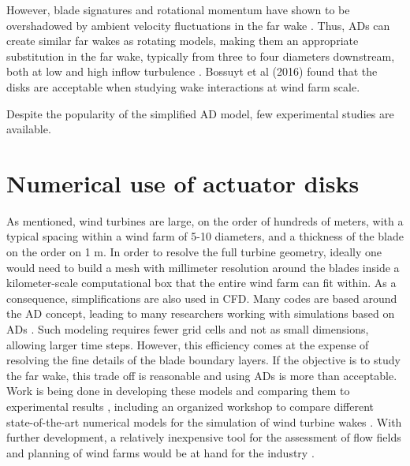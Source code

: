 However, blade signatures and rotational momentum have shown to be overshadowed by ambient velocity fluctuations in the far wake \cite{Aubrun2013}. Thus, \gls{AD}s can create similar far wakes as rotating models, making them an appropriate substitution in the far wake, typically from three to four diameters downstream, both at low and high inflow turbulence \cite{Neunaber} \cite{Aubrun2019} \cite{Lignarolo2016} \cite{Lignarolo2014} \cite{Aubrun2013} . Bossuyt et al (2016) \cite{Bossuyt2016} found that the disks are acceptable when studying wake interactions at wind farm scale.  

Despite the popularity of the simplified \gls{AD} model, few experimental studies are available. 







\section{Numerical use of actuator disks}

As mentioned, wind turbines are large, on the order of hundreds of meters, with a typical spacing within a wind farm of 5-10 diameters, and a thickness of the blade on the order on 1 \si{m}. In order to resolve the full turbine geometry, ideally one would need to build a mesh with millimeter resolution around the blades inside a kilometer-scale computational box that the entire wind farm can fit within. As a consequence, simplifications are also used in \gls{CFD}. Many codes are based around the \gls{AD} concept, leading to many researchers working with simulations based on \gls{AD}s \cite{Tossas2014} \cite{Harrison2010}  \cite{Lignarolo2016} \cite{Wu2011} \cite{Wu2012} \cite{Simisiroglou2017} \cite{Stevens2014} \cite{StevensAlso2014}. Such modeling requires fewer grid cells and not as small dimensions, allowing larger time steps. However, this efficiency comes at the expense of resolving the fine details of the blade boundary layers. If the objective is to study the far wake, this trade off is reasonable and using \gls{AD}s is more than acceptable. Work is being done in developing these models and comparing them to experimental results \cite{Tossas2014} \cite{Harrison2010}, including an organized workshop to compare different state-of-the-art numerical models for the simulation of wind turbine wakes \cite{LignaroloWorkshop2016}. With further development, a relatively inexpensive tool for the assessment of flow fields and planning of wind farms would be at hand for the industry  \cite{Sforza1981} \cite{Harrison2010}. 

